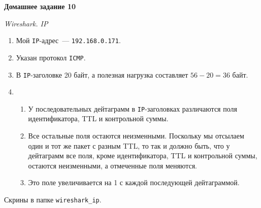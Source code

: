 \documentclass[12pt]{article}
\def\THEME{Домашнее задание 10}
\begin{document}
\begin{center}
\vspace*{0mm}
{\LARGE \bf \THEME}
\end{center}

\begin{center}
{\Large \it Wireshark. IP}
\end{center}

\begin{enumerate}

\item Мой \texttt{IP}-адрес~--- \texttt{192.168.0.171}.

\item Указан протокол \texttt{ICMP}.

\item В \texttt{IP}-заголовке 20 байт, а полезная нагрузка составляет $56 - 20 = 36$ байт.

\item

\begin{enumerate}

\item У последовательных дейтаграмм в \texttt{IP}-заголовках различаются поля идентификатора, TTL и контрольной суммы.

\item Все остальные поля остаются неизменными. Поскольку мы отсылаем один и тот же пакет с разным TTL, то так и должно быть, что у дейтаграмм все поля, кроме идентификатора, TTL и контрольной суммы, остаются неизменными, а отмеченные поля меняются.

\item Это поле увеличивается на 1 с каждой последующей дейтаграммой.

\end{enumerate}

\end{enumerate}

Скрины в папке \texttt{wireshark\_ip}.
\end{document}
